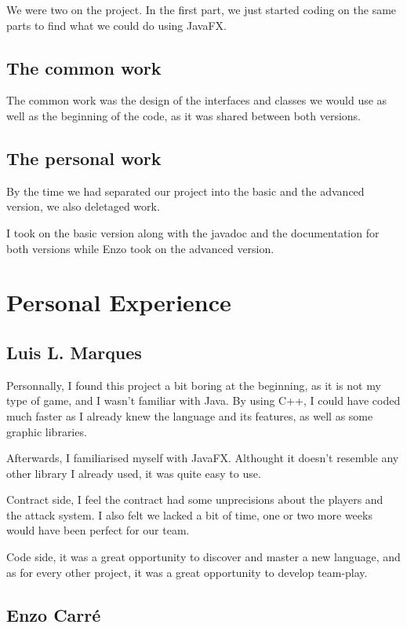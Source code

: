 \documentclass[12pt, a4paper]{report}
\begin{document}
We were two on the project. In the first part, we just started coding on the same parts to find what we could do using JavaFX.

\subsection*{The common work}

The common work was the design of the interfaces and classes we would use as well as the beginning of the code, as it was shared between both versions.

\subsection*{The personal work}

By the time we had separated our project into the basic and the advanced version, we also deletaged work.

I took on the basic version along with the javadoc and the documentation for both versions while Enzo took on the advanced version.

\section*{Personal Experience}

\subsection*{Luis L. Marques}

Personnally, I found this project a bit boring at the beginning, as it is not my type of game, and I wasn't familiar with Java. By using C++, I could have coded much faster as I already knew the language and its features, as well as some graphic libraries.

Afterwards, I familiarised myself with JavaFX. Althought it doesn't resemble any other library I already used, it was quite easy to use.

Contract side, I feel the contract had some unprecisions about the players and the attack system. I also felt we lacked a bit of time, one or two more weeks would have been perfect for our team.

Code side, it was a great opportunity to discover and master a new language, and as for every other project, it was a great opportunity to develop team-play.

\subsection*{Enzo Carré}
\end{document}

